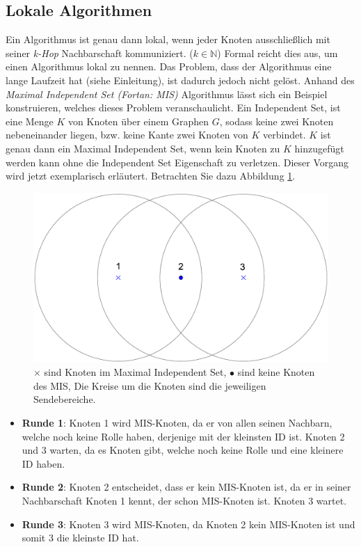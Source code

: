 \documentclass[a4paper,twoside]{IEEEtran}
\begin{document}
\subsection{Lokale Algorithmen} \label{lokal}
Ein Algorithmus ist genau dann lokal, wenn jeder Knoten ausschließlich mit seiner \emph{k-Hop} Nachbarschaft kommuniziert. ($k \in \mathds{N}$)
Formal reicht dies aus, um einen Algorithmus lokal zu nennen.
Das Problem, dass der Algorithmus eine lange Laufzeit hat (siehe Einleitung), ist dadurch jedoch nicht gelöst.
Anhand des \emph{Maximal Independent Set (Fortan: MIS)} Algorithmus lässt sich ein Beispiel konstruieren, welches dieses Problem veranschaulicht.
Ein Independent Set, ist eine Menge $K $ von Knoten über einem Graphen $G $, sodass keine zwei Knoten nebeneinander liegen, bzw. keine Kante zwei Knoten von $K $ verbindet.
$K $ ist genau dann ein Maximal Independent Set, wenn kein Knoten zu $K $ hinzugefügt werden kann ohne die Independent Set Eigenschaft zu verletzen.
Dieser Vorgang wird jetzt exemplarisch erläutert.
Betrachten Sie dazu Abbildung \ref{fig:MIS}.

\begin{figure}[h!]
\centering
\includegraphics[width=0.99\linewidth]{MIS.eps}
\caption{$\times $ sind Knoten im Maximal Independent Set, $\bullet $ sind keine Knoten des MIS, Die Kreise um die Knoten sind die jeweiligen Sendebereiche.}
\label{fig:MIS}
\end{figure}


\begin{itemize}
\item \textbf{Runde 1}: Knoten 1 wird MIS-Knoten, da er von allen seinen Nachbarn, welche noch keine Rolle haben, derjenige mit der kleinsten ID ist. Knoten 2 und 3 warten, da es Knoten gibt, welche noch keine Rolle und eine kleinere ID haben.

\item \textbf{Runde 2}: Knoten 2 entscheidet, dass er kein MIS-Knoten ist, da er in seiner Nachbarschaft Knoten 1 kennt, der schon MIS-Knoten ist. Knoten 3 wartet.

\item \textbf{Runde 3}: Knoten 3 wird MIS-Knoten, da Knoten 2 kein MIS-Knoten ist und somit 3 die kleinste ID hat. 
\end{itemize}
\end{document}
